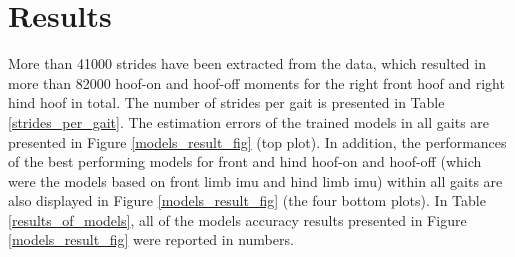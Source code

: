 \section{Results}
\label{sec:results}

More than 41000 strides have been extracted from the data, which resulted in more than 82000 hoof-on and hoof-off moments for the right front hoof and right hind hoof in total. The number of strides per gait is presented in Table \ref{strides_per_gait}. The estimation errors of the trained models in all gaits are presented in Figure \ref{models_result_fig} (top plot). In addition, the performances of the best performing models for front and hind hoof-on and hoof-off (which were the models based on front limb \gls{imu} and hind limb \gls{imu}) within all gaits are also displayed in Figure \ref{models_result_fig} (the four bottom plots). In Table \ref{results_of_models}, all of the models accuracy results presented in Figure \ref{models_result_fig} were reported in numbers.





